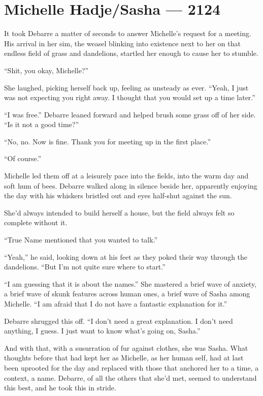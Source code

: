 \hypertarget{michelle-hadjesasha-2124}{%
\chapter{Michelle Hadje/Sasha — 2124}\label{michelle-hadjesasha-2124}}

It took Debarre a matter of seconds to answer Michelle's request for a meeting. His arrival in her sim, the weasel blinking into existence next to her on that endless field of grass and dandelions, startled her enough to cause her to stumble.

``Shit, you okay, Michelle?''

She laughed, picking herself back up, feeling as unsteady as ever. ``Yeah, I just was not expecting you right away. I thought that you would set up a time later.''

``I was free.'' Debarre leaned forward and helped brush some grass off of her side. ``Is it not a good time?''

``No, no. Now is fine. Thank you for meeting up in the first place.''

``Of course.''

Michelle led them off at a leisurely pace into the fields, into the warm day and soft hum of bees. Debarre walked along in silence beside her, apparently enjoying the day with his whiskers bristled out and eyes half-shut against the sun.

She'd always intended to build herself a house, but the field always felt so complete without it.

``True Name mentioned that you wanted to talk.''

``Yeah,'' he said, looking down at his feet as they poked their way through the dandelions. ``But I'm not quite sure where to start.''

``I am guessing that it is about the names.'' She mastered a brief wave of anxiety, a brief wave of skunk features across human ones, a brief wave of Sasha among Michelle. ``I am afraid that I do not have a fantastic explanation for it.''

Debarre shrugged this off. ``I don't need a great explanation. I don't need anything, I guess. I just want to know what's going on, Sasha.''

And with that, with a susurration of fur against clothes, she was Sasha. What thoughts before that had kept her as Michelle, as her human self, had at last been uprooted for the day and replaced with those that anchored her to a time, a context, a name. Debarre, of all the others that she'd met, seemed to understand this best, and he took this in stride.

